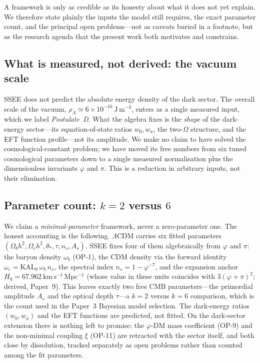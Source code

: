 \documentclass[a4paper,11pt]{article}
\newcommand{\kms}{\mathrm{km\,s^{-1}\,Mpc^{-1}}}
\begin{document}
A framework is only as credible as its honesty about what it does not yet
explain. We therefore state plainly the inputs the model still requires, the
exact parameter count, and the principal open problems---not as caveats buried
in a footnote, but as the research agenda that the present work both motivates
and constrains.

\subsection{What is measured, not derived: the vacuum scale}

SSEE does not predict the absolute energy density of the dark sector. The
overall scale of the vacuum, $\rho_\Lambda\simeq6\times10^{-10}~\mathrm{J\,
m^{-3}}$, enters as a single measured input, which we label \emph{Postulate~D}.
What the algebra fixes is the \emph{shape} of the dark-energy sector---its
equation-of-state ratios $w_0,w_a$, the two-$\Omega$ structure, and the EFT
function profile---not its amplitude. We make no claim to have solved the
cosmological-constant problem; we have moved its free numbers from six tuned
cosmological parameters down to a single measured normalisation plus the
dimensionless invariants $\varphi$ and $\pi$. This is a reduction in arbitrary
inputs, not their elimination.

\subsection{Parameter count: $k=2$ versus $6$}

We claim a \emph{minimal-parameter} framework, never a zero-parameter one. The
honest accounting is the following. $\Lambda$CDM carries six fitted parameters
$(\Omega_b h^2,\Omega_c h^2,\theta_*,\tau,n_s,A_s)$. SSEE fixes four of them
algebraically from $\varphi$ and $\pi$: the baryon density $\omega_b$ (OP-1), the
CDM density via the forward identity $\omega_c=\mathrm{KAL}_0\,\omega_b\,n_s$, the
spectral index $n_s=1-\varphi^{-7}$, and the expansion anchor $H_0=67.962~\kms$
(whose value in these units coincides with $3(\varphi+\pi)^2$; derived, Paper~9). This leaves exactly two free CMB parameters---the primordial
amplitude $A_s$ and the optical depth $\tau$---a $k=2$ versus $k=6$ comparison,
which is the count used in the Paper~3 Bayesian model selection. The dark-energy
ratios $(w_0,w_a)$ and the EFT functions are predicted, not fitted. On the
dark-sector extension there is nothing left to promise: the $\varphi$-DM mass
coefficient (OP-9) and the non-minimal coupling $\xi$ (OP-11) are retracted
with the sector itself, and both close by dissolution, tracked separately
as open problems rather than counted among the fit parameters.
\end{document}

